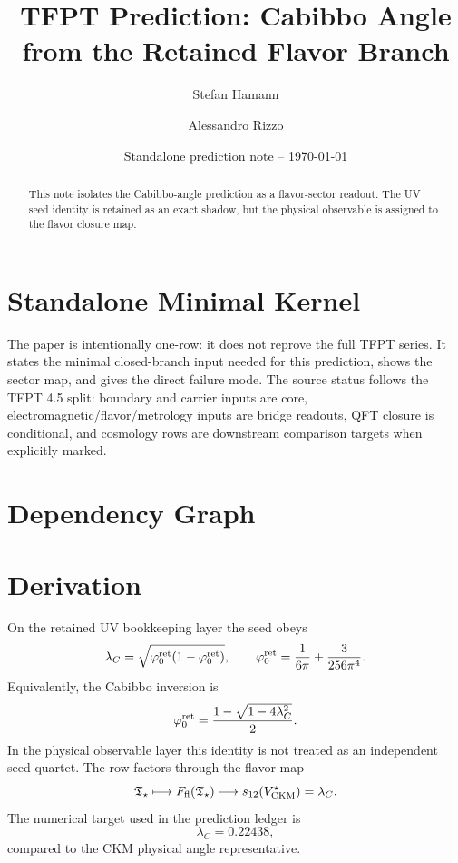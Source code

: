 \documentclass[11pt,a4paper]{article}
\title{\color{tfptblue}\textbf{TFPT Prediction: Cabibbo Angle from the Retained Flavor Branch}}
\author{Stefan Hamann \and Alessandro Rizzo}
\date{{\normalsize\color{tfptgray}\sffamily Standalone prediction note -- \today}}
\begin{document}
\maketitle

\begin{abstract}
This note isolates the Cabibbo-angle prediction as a flavor-sector readout. The UV seed identity is retained as an exact shadow, but the physical observable is assigned to the flavor closure map.
\end{abstract}



\section{Standalone Minimal Kernel}
\MinimalKernelBox

The paper is intentionally one-row: it does not reprove the full TFPT series. It states the minimal closed-branch input needed for this prediction, shows the sector map, and gives the direct failure mode. The source status follows the TFPT 4.5 split: boundary and carrier inputs are core, electromagnetic/flavor/metrology inputs are bridge readouts, QFT closure is conditional, and cosmology rows are downstream comparison targets when explicitly marked.


\section{Dependency Graph}

\section{Derivation}

On the retained UV bookkeeping layer the seed obeys
\[
\lambda_C=\sqrt{\varphi_0^{\mathrm{ret}}(1-\varphi_0^{\mathrm{ret}})},
\qquad
\varphi_0^{\mathrm{ret}}=\frac{1}{6\pi}+\frac{3}{256\pi^4}.
\]
Equivalently, the Cabibbo inversion is
\[
\varphi_0^{\mathrm{ret}}=\frac{1-\sqrt{1-4\lambda_C^2}}{2}.
\]
In the physical observable layer this identity is not treated as an independent seed quartet. The row factors through the flavor map
\[
\mathfrak T_{\star}\longmapsto F_{\mathrm{fl}}(\mathfrak T_{\star})\longmapsto s_{12}(V_{\mathrm{CKM}}^\star)=\lambda_C.
\]
The numerical target used in the prediction ledger is
\[
\lambda_C=0.22438,
\]
compared to the CKM physical angle representative.
\end{document}
